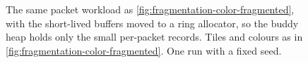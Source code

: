 \begin{figure}[htb]
\centering
\begin{minipage}[t]{0.32\linewidth}
  \small
  
\end{minipage}%
\begin{minipage}[t]{0.66\linewidth}
  \centering
  
\end{minipage}
\caption{The same packet workload as
\cref{fig:fragmentation-color-fragmented}, with the short-lived buffers
moved to a ring allocator, so the buddy heap holds only the small
per-packet records. Tiles and colours as in
\cref{fig:fragmentation-color-fragmented}. One run with a fixed seed.}
\label{fig:fragmentation-color-unfragmented}
\end{figure}
